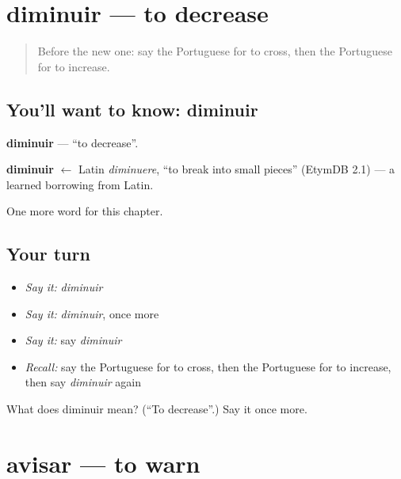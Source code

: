 \section[diminuir]{diminuir — to decrease}

\label{lesson:PT-C174-diminuir}



\begin{quote}
Before the new one: say the Portuguese for to cross, then the Portuguese for to increase.
\end{quote}

\subsection*{You'll want to know: diminuir}
\textbf{diminuir} — \textquotedblleft{}to decrease\textquotedblright{}.

\begin{cousinweb}
\textbf{diminuir} $\leftarrow$ Latin \emph{diminuere}, \textquotedblleft{}to break into small pieces\textquotedblright{} (EtymDB 2.1) — a learned borrowing from Latin.
\end{cousinweb}

\begin{grammarlens}[title={What you've built}]
One more word for this chapter.
\end{grammarlens}

\subsection*{Your turn}
\begin{itemize}
\raggedright
  \item \emph{Say it:} \emph{diminuir}
  \item \emph{Say it:} \emph{diminuir}, once more
  \item \emph{Say it:} say \emph{diminuir}
  \item \emph{Recall:} say the Portuguese for to cross, then the Portuguese for to increase, then say \emph{diminuir} again
\end{itemize}

\begin{tcolorbox}[breakable,colback=teal!4,colframe=teal!35!black,title={Before you move on}]
What does diminuir mean? (\textquotedblleft{}To decrease\textquotedblright{}.) Say it once more.
\end{tcolorbox}
\section[avisar]{avisar — to warn}

